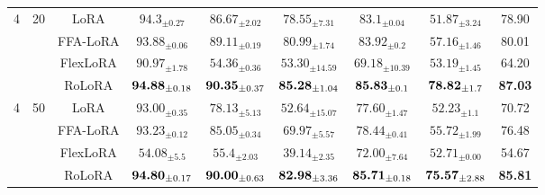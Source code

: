 \documentclass{article}
\theoremstyle{plain}
\theoremstyle{definition}
\theoremstyle{remark}
\begin{document}
\begin{table}[h!]
{\begin{tabular}{ccccccccc}
    \multirow{4}{*}{4} & \multirow{4}{*}{20}
    & LoRA       & $\text{94.3}_{\pm \text{0.27}}$  & $\text{86.67}_{\pm \text{2.02}}$ & $\text{78.55}_{\pm \text{7.31}}$ & $\text{83.1}_{\pm \text{0.04}}$  & $\text{51.87}_{\pm \text{3.24}}$ & 78.90 \\
    &             & FFA-LoRA   & $\text{93.88}_{\pm \text{0.06}}$ & $\text{89.11}_{\pm \text{0.19}}$ & $\text{80.99}_{\pm \text{1.74}}$ & $\text{83.92}_{\pm \text{0.2}}$  & $\text{57.16}_{\pm \text{1.46}}$ & 80.01 \\
    &             & FlexLoRA   & $\text{90.97}_{\pm \text{1.78}}$ & $\text{54.36}_{\pm \text{0.36}}$ & $\text{53.30}_{\pm \text{14.59}}$ & $\text{69.18}_{\pm \text{10.39}}$ & $\text{53.19}_{\pm \text{1.45}}$ & 64.20 \\
    &             & \cellcolor{ours}  RoLoRA & \cellcolor{ours} $\text{\textbf{94.88}}_{\pm \text{0.18}}$ & \cellcolor{ours}  $\text{\textbf{90.35}}_{\pm \text{0.37}}$ & \cellcolor{ours} $\text{\textbf{85.28}}_{\pm \text{1.04}}$ & \cellcolor{ours}  $\text{\textbf{85.83}}_{\pm \text{0.1}}$ & \cellcolor{ours} $\text{\textbf{78.82}}_{\pm \text{1.7}}$ & \cellcolor{ours}  \textbf{87.03} \\
    \midrule

    \multirow{4}{*}{4} & \multirow{4}{*}{50}
    & LoRA       & $\text{93.00}_{\pm \text{0.35}}$ & $\text{78.13}_{\pm \text{5.13}}$ & $\text{52.64}_{\pm \text{15.07}}$ & $\text{77.60}_{\pm \text{1.47}}$ & $\text{52.23}_{\pm \text{1.1}}$  & 70.72 \\
    &             & FFA-LoRA   & $\text{93.23}_{\pm \text{0.12}}$ & $\text{85.05}_{\pm \text{0.34}}$ & $\text{69.97}_{\pm \text{5.57}}$  & $\text{78.44}_{\pm \text{0.41}}$ & $\text{55.72}_{\pm \text{1.99}}$ & 76.48 \\
    &             & FlexLoRA   & $\text{54.08}_{\pm \text{5.5}}$  & $\text{55.4}_{\pm \text{2.03}}$  & $\text{39.14}_{\pm \text{2.35}}$  & $\text{72.00}_{\pm \text{7.64}}$ & $\text{52.71}_{\pm \text{0.00}}$ & 54.67 \\
    &             & \cellcolor{ours}  RoLoRA & \cellcolor{ours} $\text{\textbf{94.80}}_{\pm \text{0.17}}$ & \cellcolor{ours}  $\text{\textbf{90.00}}_{\pm \text{0.63}}$ & \cellcolor{ours} $\text{\textbf{82.98}}_{\pm \text{3.36}}$ & \cellcolor{ours}  $\text{\textbf{85.71}}_{\pm \text{0.18}}$ & \cellcolor{ours} $\text{\textbf{75.57}}_{\pm \text{2.88}}$ & \cellcolor{ours}  \textbf{85.81} \\
    \midrule


\end{tabular}}
\end{table}
\end{document}
